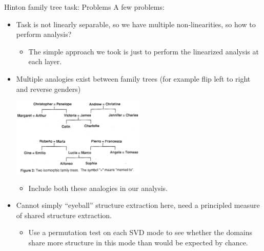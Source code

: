 \documentclass{beamer}
\begin{document}
\begin{frame}{Hinton family tree task: Problems}
A few problems:
\begin{itemize}
    \item<2-> Task is not linearly separable, so we have multiple non-linearities, so how to perform analysis?
    \begin{itemize}
	\item<3-> The simple approach we took is just to perform the linearized analysis at each layer. 
    \end{itemize}
    \item<4-> Multiple analogies exist between family trees (for example flip left to right and reverse genders) 
     {
    \begin{center}
	\includegraphics[width = 0.5\textwidth]{../writing/cogsci_2017/figures/hinton_family_tree_figure.png}
    \end{center}
    }
    \begin{itemize}
	\item<5-> Include both these analogies in our analysis. 
    \end{itemize}
    \item<6-> Cannot simply ``eyeball'' structure extraction here, need a principled measure of shared structure extraction. 
    \begin{itemize}
	\item<7-> Use a permutation test on each SVD mode to see whether the domains share more structure in this mode than would be expected by chance. 
    \end{itemize}
\end{itemize}
\end{frame}
\end{document}
